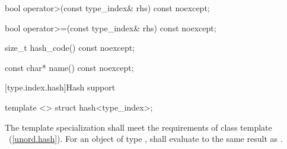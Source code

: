\begin{itemdescr}
\pnum
\returns {}
\end{itemdescr}

%
%
\begin{itemdecl}
bool operator>(const type_index& rhs) const noexcept;
\end{itemdecl}

\begin{itemdescr}
\pnum
\returns {}
\end{itemdescr}

%
%
\begin{itemdecl}
bool operator>=(const type_index& rhs) const noexcept;
\end{itemdecl}

\begin{itemdescr}
\pnum
\returns {}
\end{itemdescr}

%
%
\begin{itemdecl}
size_t hash_code() const noexcept;
\end{itemdecl}

\begin{itemdescr}
\pnum
\returns {}
\end{itemdescr}

%
%
\begin{itemdecl}
const char* name() const noexcept;
\end{itemdecl}

\begin{itemdescr}
\pnum
\returns {}
\end{itemdescr}

[type.index.hash]{Hash support}

%
\begin{itemdecl}
template <> struct hash<type_index>;
\end{itemdecl}

\begin{itemdescr}
\pnum
The template specialization shall meet the requirements of class template
~(\ref{unord.hash}). For an object  of type ,
 shall evaluate to the same result as .
\end{itemdescr}
